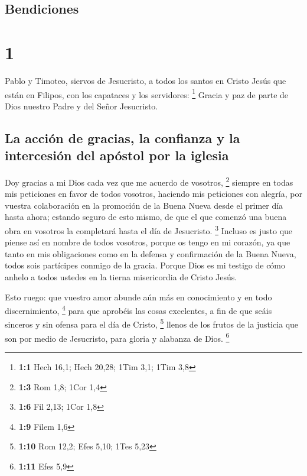 \hypertarget{bendiciones}{%
\subsection{Bendiciones}\label{bendiciones}}

\hypertarget{section}{%
\section{1}\label{section}}

 Pablo y Timoteo, siervos de Jesucristo, a todos los
santos en Cristo Jesús que están en Filipos, con los capataces y los
servidores: \footnote{\textbf{1:1} Hech 16,1; Hech 20,28; 1Tim 3,1; 1Tim
  3,8}  Gracia y paz de parte de Dios nuestro Padre y del
Señor Jesucristo.

\hypertarget{la-acciuxf3n-de-gracias-la-confianza-y-la-intercesiuxf3n-del-apuxf3stol-por-la-iglesia}{%
\subsection{La acción de gracias, la confianza y la intercesión del
apóstol por la
iglesia}\label{la-acciuxf3n-de-gracias-la-confianza-y-la-intercesiuxf3n-del-apuxf3stol-por-la-iglesia}}

 Doy gracias a mi Dios cada vez que me acuerdo de
vosotros, \footnote{\textbf{1:3} Rom 1,8; 1Cor 1,4} 
siempre en todas mis peticiones en favor de todos vosotros, haciendo mis
peticiones con alegría,  por vuestra colaboración en la
promoción de la Buena Nueva desde el primer día hasta ahora;
 estando seguro de esto mismo, de que el que comenzó una
buena obra en vosotros la completará hasta el día de Jesucristo.
\footnote{\textbf{1:6} Fil 2,13; 1Cor 1,8}  Incluso es
justo que piense así en nombre de todos vosotros, porque os tengo en mi
corazón, ya que tanto en mis obligaciones como en la defensa y
confirmación de la Buena Nueva, todos sois partícipes conmigo de la
gracia.  Porque Dios es mi testigo de cómo anhelo a todos
ustedes en la tierna misericordia de Cristo Jesús.

 Esto ruego: que vuestro amor abunde aún más en
conocimiento y en todo discernimiento, \footnote{\textbf{1:9} Filem 1,6}
 para que aprobéis las cosas excelentes, a fin de que
seáis sinceros y sin ofensa para el día de Cristo, \footnote{\textbf{1:10}
  Rom 12,2; Efes 5,10; 1Tes 5,23}  llenos de los frutos
de la justicia que son por medio de Jesucristo, para gloria y alabanza
de Dios. \footnote{\textbf{1:11} Efes 5,9}

